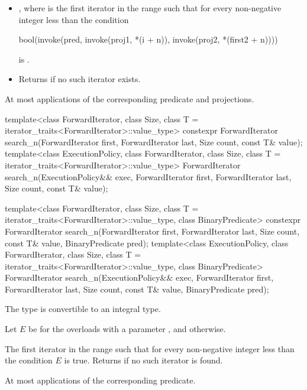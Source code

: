 \begin{itemdescr}
\pnum
\returns
\begin{itemize}
\item
  ,
  where  is
  the first iterator in the range 
  such that
  for every non-negative integer  less than 
  the condition
\begin{codeblock}
bool(invoke(pred, invoke(proj1, *(i + n)), invoke(proj2, *(first2 + n))))
\end{codeblock}
  is .
\item
  Returns  if no such iterator exists.
\end{itemize}

\pnum
\complexity
At most  applications
of the corresponding predicate and projections.
\end{itemdescr}

%
\begin{itemdecl}
template<class ForwardIterator, class Size, class T = iterator_traits<ForwardIterator>::value_type>
  constexpr ForwardIterator
    search_n(ForwardIterator first, ForwardIterator last,
             Size count, const T& value);
template<class ExecutionPolicy, class ForwardIterator, class Size,
         class T = iterator_traits<ForwardIterator>::value_type>
  ForwardIterator
    search_n(ExecutionPolicy&& exec,
             ForwardIterator first, ForwardIterator last,
             Size count, const T& value);

template<class ForwardIterator, class Size, class T = iterator_traits<ForwardIterator>::value_type,
         class BinaryPredicate>
  constexpr ForwardIterator
    search_n(ForwardIterator first, ForwardIterator last,
             Size count, const T& value,
             BinaryPredicate pred);
template<class ExecutionPolicy, class ForwardIterator, class Size,
         class T = iterator_traits<ForwardIterator>::value_type,
         class BinaryPredicate>
  ForwardIterator
    search_n(ExecutionPolicy&& exec,
             ForwardIterator first, ForwardIterator last,
             Size count, const T& value,
             BinaryPredicate pred);
\end{itemdecl}

\begin{itemdescr}

\pnum
\mandates
The type 
is convertible to an integral type.

\pnum
Let $E$ be 
for the overloads with a parameter ,
and  otherwise.

\pnum
\returns
The first iterator  in the range 
such that for every non-negative integer  less than 
the condition $E$ is true.
Returns  if no such iterator is found.

\pnum
\complexity
At most  applications of the corresponding predicate.
\end{itemdescr}


